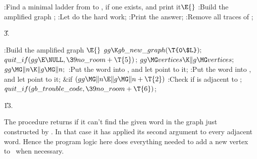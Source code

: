 \B{}:Find a minimal ladder from  to , if one
exists, and print it\X${}\E{}$\6
:Build the amplified graph \X;\6
:Let  do the hard work\X;\6
:Print the answer\X;\6
:Remove all traces of \X;\par
\U3.\fi

\B{}:Build the amplified graph \X${}\E{}$\6
$\\{gg}\K\\{gb\_new\_graph}(\T{0\$L});{}$\6
${}\\{quit\_if}(\\{gg}\E\NULL,\39\\{no\_room}+\T{5}){}$;\6
${}\\{gg}\MG\\{vertices}\K\|g\MG\\{vertices};{}$\6
${}\\{gg}\MG\|n\K\|g\MG\|n;{}$\6
:Put the  word into , and let  point to
it\X;\6
:Put the  word into , and let  point to
it\X;\6
\&{if} ${}(\\{gg}\MG\|n\E\|g\MG\|n+\T{2}){}$\1\5
:Check if  is adjacent to \X;\2\6
${}\\{quit\_if}(\\{gb\_trouble\_code},\39\\{no\_room}+\T{6}){}$;\par
\U13.\fi

The  procedure returns \PB{$\NULL$} if it can't find
the given word
in the graph just constructed by . In that case it has applied
its
second argument to every adjacent word. Hence the program logic here
does everything needed to add a new vertex to~ when necessary.

